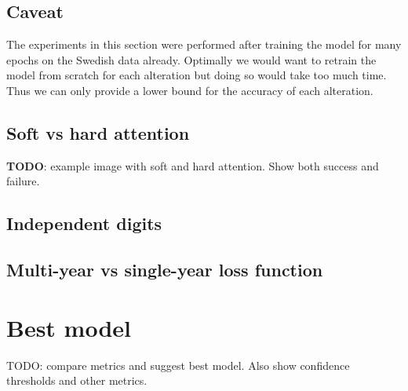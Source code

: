 \subsection{Caveat}
The experiments in this section were performed after training the model for many epochs on the Swedish data already. Optimally we would want to retrain the model from scratch for each alteration but doing so would take too much time. Thus we can only provide a lower bound for the accuracy of each alteration.



\subsection{Soft vs hard attention}

\textbf{TODO}: example image with soft and hard attention. Show both success and failure.

\subsection{Independent digits} \label{sssec:ind_digits}

\subsection{Multi-year vs single-year loss function}


\section{Best model}

TODO: compare metrics and suggest best model. Also show confidence thresholds and other metrics.